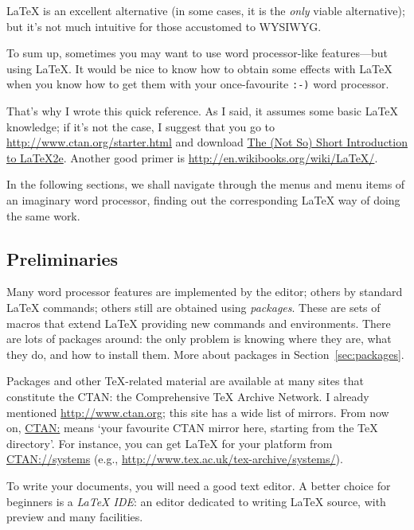 \documentclass[a4paper,11pt]{article}
\begin{document}
\LaTeX{} is an excellent alternative (in some cases, it is the
\emph{only} viable alternative); but it's not much intuitive for those
accustomed to WYSIWYG.

To sum up, sometimes you may want to use word processor-like
features---but using \LaTeX. It would be nice to know how to obtain
some effects with \LaTeX{} when you know how to get them with your
once-favourite \texttt{:-)} word processor.

That's why I wrote this quick reference. As I said, it assumes some
basic \LaTeX{} knowledge; if it's not the case, I suggest that you go
to \url{http://www.ctan.org/starter.html} and download 
\href{http://www.ctan.org/tex-archive/info/lshort/}{The (Not So) Short
Introduction to \LaTeX2e{}}. Another good primer is
\url{http://en.wikibooks.org/wiki/LaTeX/}.

In the following sections, we shall navigate through the menus and
menu items of an imaginary word processor, finding out the
corresponding \LaTeX{} way of doing the same work.



\subsection{Preliminaries}

Many word processor features are implemented by the editor; others by
standard \LaTeX{} commands; others still are obtained using
\emph{packages}. These are sets of macros that extend \LaTeX{}
providing new commands and environments. There are lots of packages
around: the only problem is knowing where they are, what they do, and
how to install them. More about packages in
Section~\ref{sec:packages}.

Packages and other \TeX{}-related material are available at many sites
that constitute the CTAN: the Comprehensive TeX Archive Network. I
already mentioned \url{http://www.ctan.org}; this site has a wide list
of mirrors. From now on, \href{http://www.ctan.org}{CTAN:} means `your
favourite CTAN mirror here, starting from the \TeX{} directory'. For
instance, you can get \LaTeX{} for your platform from
\href{http://www.tex.ac.uk/tex-archive/systems}{CTAN://systems} (e.g.,
\url{http://www.tex.ac.uk/tex-archive/systems/}).

To write your documents, you will need a good text editor. A better
choice for beginners is a \emph{\LaTeX{} IDE}: an editor dedicated
to writing \LaTeX{} source, with preview and many facilities.
\end{document}

